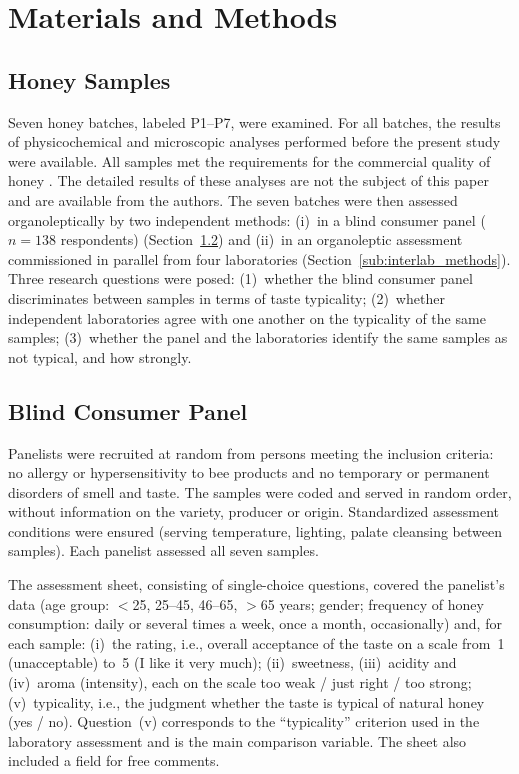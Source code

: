 \section{Materials and Methods}

\subsection{Honey Samples}
\label{sub:samples}

Seven honey batches, labeled P1--P7, were examined. For all batches, the
results of physicochemical and microscopic analyses performed before the
present study were available. All samples met the requirements for the
commercial quality of honey \cite{RozporzadzenieMRiRW2003}. The detailed
results of these analyses are not the subject of this paper and are available
from the authors. The seven batches were then assessed organoleptically by two
independent methods: (i)~in a blind consumer panel ($n = 138$ respondents)
(Section~\ref{sub:panel}) and (ii)~in an organoleptic assessment commissioned
in parallel from four laboratories (Section~\ref{sub:interlab_methods}). Three
research questions were posed: (1)~whether the blind consumer panel
discriminates between samples in terms of taste typicality; (2)~whether
independent laboratories agree with one another on the typicality of the same
samples; (3)~whether the panel and the laboratories identify the same samples
as not typical, and how strongly.

\subsection{Blind Consumer Panel}
\label{sub:panel}

Panelists were recruited at random from persons meeting the inclusion
criteria: no allergy or hypersensitivity to bee products and no temporary or
permanent disorders of smell and taste. The samples were coded and served in
random order, without information on the variety, producer or origin.
Standardized assessment conditions were ensured (serving temperature,
lighting, palate cleansing between samples). Each panelist assessed all seven
samples.

The assessment sheet, consisting of single-choice questions, covered the
panelist's data (age group: $<$25, 25--45, 46--65, $>$65 years; gender;
frequency of honey consumption: daily or several times a week, once a month,
occasionally) and, for each sample: (i)~the rating, i.e., overall acceptance
of the taste on a scale from~1 (unacceptable) to~5 (I like it very much);
(ii)~sweetness, (iii)~acidity and (iv)~aroma (intensity), each on the scale
too weak / just right / too strong; (v)~typicality, i.e., the judgment whether
the taste is typical of natural honey (yes / no). Question~(v) corresponds to
the ``typicality'' criterion used in the laboratory assessment and is the main
comparison variable. The sheet also included a field for free comments.

